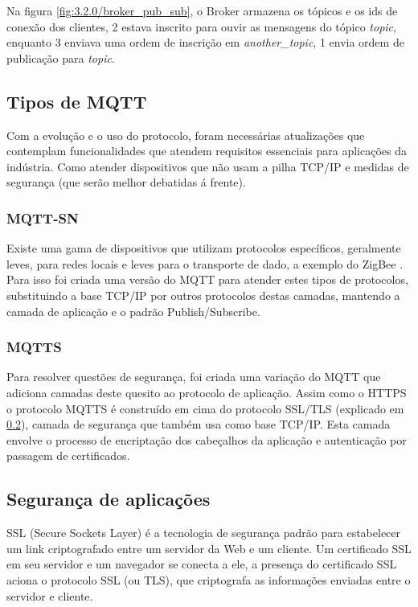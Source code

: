 Na figura \ref{fig:3.2.0/broker_pub_sub}, o Broker armazena os tópicos e os ids de conexão dos clientes, 2 estava inscrito para ouvir as mensagens do tópico \textit{topic}, enquanto 3 enviava uma ordem de inscrição em \textit{another\_topic}, 1 envia ordem de publicação para \textit{topic}.


\subsection{Tipos de MQTT}
\label{subsection:tipos_mqtt}

Com a evolução e o uso do protocolo, foram necessárias atualizações que contemplam funcionalidades que atendem  requisitos essenciais para aplicações da indústria. Como atender dispositivos que não usam a pilha TCP/IP e medidas de segurança (que serão melhor debatidas á frente). 

\subsubsection{MQTT-SN}
\label{subsubsection:mqtt-v}

Existe uma gama de dispositivos que utilizam protocolos específicos, geralmente leves, para redes locais e leves para o transporte de dado, a exemplo do ZigBee \cite{zigbee}. Para isso foi criada uma versão do MQTT para atender estes tipos de protocolos, substituindo a base TCP/IP por outros protocolos destas camadas, mantendo a camada de aplicação e o padrão Publish/Subscribe.

\subsubsection{MQTTS}
\label{subsubsection:mqtts}

Para resolver questões de segurança, foi criada uma variação do MQTT que adiciona camadas deste quesito ao protocolo de aplicação. Assim como o HTTPS o protocolo MQTTS é construído em cima do protocolo SSL/TLS (explicado em \ref{subsection:seguranca}), camada de segurança que também usa como base TCP/IP. Esta camada envolve o processo de encriptação dos cabeçalhos da aplicação e autenticação por passagem de certificados. 

\subsection{Segurança de aplicações}
\label{subsection:seguranca}

SSL \cite{ssl} (Secure Sockets Layer) é a tecnologia de segurança padrão para estabelecer um link criptografado entre um servidor da Web e um cliente. Um certificado SSL em seu servidor e um navegador se conecta a ele, a presença do certificado SSL aciona o protocolo SSL (ou TLS), que criptografa as informações enviadas entre o servidor e cliente.

